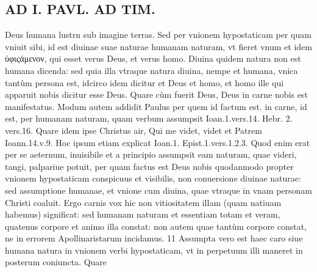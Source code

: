\documentclass{article}
\begin{document}
\begin{pages}
\section*{AD I. PAVL. AD TIM. }
\marginpar{[ p.176 ]}\pstart Deus humana lustrn sub imagine terras. Sed per vnionem hypostaticam per quam vniuit sibi, id est diuinae suae naturae humanam naturam, vt fieret vnum et idem ύφιςάμενον, qui esset verus Deus, et verus homo. Diuina quidem natura non est humana dicenda: sed quia illa vtraque natura diuina, nempe et humana, vnica tantùm persona est, idcirco idem dicitur et Deus et homo, et homo ille qui apparuit nobis dicitur esse Deus. Quare cùm fuerit Deus, Deus in carne nobis est manifestatus.  \pend\pstart Modum autem addidit Paulus per quem id factum est. in carne, id est, per humanam naturam, quam verbum assumpsit Ioan.1.vers.14. Hebr. 2. vers.16. Quare idem ipse Christus air, Qui me videt, videt et Patrem Ioann.14.v.9. Hoc ipsum etiam explicat Ioan.1. Epist.1.vers.1.2.3. Quod enim erat per se aeternum, inuisibile et a principio assumpsit eam naturam, quae videri, tangi, palpariue potuit, per quam factus est Deus nobis quodanmodo propter vnionem hypostaticam conspicuus et visibilis, non conuersione diuinae naturae: sed assumptione humanae, et vnione cum diuina, quae vtraque in vnam personam Christi coaluit. Ergo carnis vox hic non vitiositatem illam (quam natiuam habemus) significat: sed humanam naturam et essentiam totam et veram, quatenus corpore et animo illa constat: non autem quae tantùm corpore constat, ne in errorem Apollinaristarum incidamus. 11  \pend\pstart Assumpta vero est haec caro siue humana natura in vnionem verbi hypostaticam, vt in perpetuum illi maneret in posterum coniuncta. Quare  \pend

\end{pages}
\end{document}
